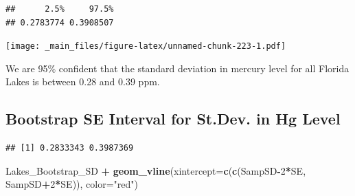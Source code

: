 \documentclass[]{book}
\newenvironment{Shaded}{\begin{snugshade}}{\end{snugshade}}
\newcommand{\KeywordTok}[1]{\textcolor[rgb]{0.13,0.29,0.53}{\textbf{#1}}}
\newcommand{\DataTypeTok}[1]{\textcolor[rgb]{0.13,0.29,0.53}{#1}}
\newcommand{\DecValTok}[1]{\textcolor[rgb]{0.00,0.00,0.81}{#1}}
\newcommand{\FloatTok}[1]{\textcolor[rgb]{0.00,0.00,0.81}{#1}}
\newcommand{\StringTok}[1]{\textcolor[rgb]{0.31,0.60,0.02}{#1}}
\newcommand{\OperatorTok}[1]{\textcolor[rgb]{0.81,0.36,0.00}{\textbf{#1}}}
\newcommand{\NormalTok}[1]{#1}
\begin{document}
\begin{Shaded}
\end{Shaded}

\begin{verbatim}
##      2.5%     97.5% 
## 0.2783774 0.3908507
\end{verbatim}

\texttt{[image: \_main\_files/figure-latex/unnamed-chunk-223-1.pdf]}

We are 95\% confident that the standard deviation in mercury level for
all Florida Lakes is between 0.28 and 0.39 ppm.

\subsection{Bootstrap SE Interval for St.Dev. in Hg
Level}\label{bootstrap-se-interval-for-st.dev.-in-hg-level}

\begin{Shaded}
\end{Shaded}

\begin{verbatim}
## [1] 0.2833343 0.3987369
\end{verbatim}

\begin{Shaded}
\begin{Highlighting}[]
\NormalTok{Lakes_Bootstrap_SD  }\OperatorTok{+}\StringTok{ }\KeywordTok{geom_vline}\NormalTok{(}\DataTypeTok{xintercept=}\KeywordTok{c}\NormalTok{(}\KeywordTok{c}\NormalTok{(SampSD}\OperatorTok{-}\DecValTok{2}\OperatorTok{*}\NormalTok{SE, SampSD}\OperatorTok{+}\DecValTok{2}\OperatorTok{*}\NormalTok{SE)), }\DataTypeTok{color=}\StringTok{"red"}\NormalTok{) }
\end{Highlighting}
\end{Shaded}
\end{document}
